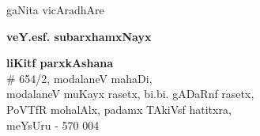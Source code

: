 \thispagestyle{empty}
\begin{center}
{\fontsize{30}{32}\selectfont gaNita vicAradhAre}
\vfill


{\large\bfseries veY.esf. subarxhamxNayx}\\[4pt]
   {\fontsize{12}{14}\selectfont{rASaTxrXparxshasitx purasakxqqta, nivaqtatx gaNita shikaSxka\\[4pt]
   saMta PiloVminA pwrxDhashAle\\[4pt]
   meYsUru}}

\vfill


{{\large\bfseries liKitf parxkAshana}\\[5pt]
{\rm \# 654/2}, modalaneV mahaDi,\\
modalaneV muKayx rasetx, bi.bi. gADaRnf rasetx, \\
PoVTfR mohalAlx, padamx TAkiVsf hatitxra,\\
meYsUru - 570 004}


\end{center}
